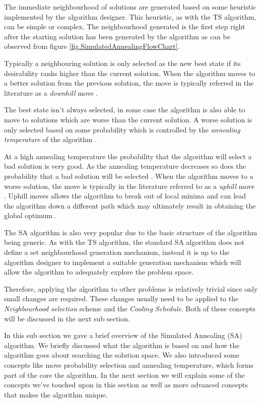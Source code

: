 The immediate neighbourhood of solutions are generated based on some heuristic implemented by the algorithm designer\cite{AIModernApproach}. This heuristic, as with the TS algorithm, can be simple or complex\cite{}. The neighbourhood generated is the first step right after the starting solution has been generated by the algorithm as can be observed from figure \ref{fig.SimulatedAnnealingFlowChart}.

Typically a neighbouring solution is only selected as the new best state if its desirability ranks higher than the current solution. When the algorithm moves to a better solution from the previous solution, the move is typically referred in the literature as a \emph{downhill} move \cite{CurveFittingSA}.

The best state isn't always selected, in some case the algorithm is also able to move to solutions which are worse than the current solution. A worse solution is only selected based on some probability which is controlled by the \emph{annealing temperature} of the algorithm \cite{TheoPraticalSA}. 

At a high annealing temperature the probability that the algorithm will select a bad solution is very good. As the annealing temperature decreases so does the probability that a bad solution will be selected \cite{CurveFittingSA}. When the algorithm moves to a worse solution, the move is typically in the literature referred to as a \emph{uphill} move \cite{CurveFittingSA}. Uphill moves allows the algorithm to break out of local minima and can lead the algorithm down a different path which may ultimately result in obtaining the global optimum \cite{SASingleMultiObj}. 

The SA algorithm is also very popular due to the basic structure of the algorithm being generic\cite{VariousCoolingSA}. As with the TS algorithm, the standard SA algorithm does not define a set neighbourhood generation mechanism, instead it is up to the algorithm designer to implement a suitable generation mechanism which will allow the algorithm to adequately explore the problem space\cite{VariousCoolingSA}. 

Therefore, applying the algorithm to other problems is relatively trivial since only small changes are required. These changes usually need to be applied to the \emph{Neighbourhood selection} scheme and the \emph{Cooling Schedule}\cite{VariousCoolingSA,DormRoomSA}. Both of these concepts will be discussed in the next sub section.

In this sub section we gave a brief overview of the Simulated Annealing (SA) algorithm. We briefly discussed what the algorithm is based on and how the algorithm goes about searching the solution space. We also introduced some concepts like move probability selection and annealing temperature, which forms part of the core the algorithm. In the next section we will explain some of the concepts we've touched upon in this section as well as more advanced concepts that makes the algorithm unique.

